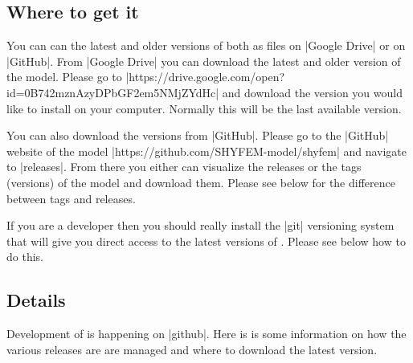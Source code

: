 
%
%
%
%
%
%
%

\subsection{Where to get it}

You can can the latest and older versions of \shyfem{} both as
files on |Google Drive| or on |GitHub|. From |Google Drive| you can
download the latest and older version of the model. Please go to
|https://drive.google.com/open?id=0B742mznAzyDPbGF2em5NMjZYdHc| and
download the version you would like to install on your computer. Normally
this will be the last available version.

You can also download the versions from |GitHub|. Please
go to the |GitHub| website of the \shyfem{} model
|https://github.com/SHYFEM-model/shyfem| and navigate to |releases|. From
there you either can visualize the releases or the tags (versions)
of the model and download them. Please see below for the difference
between tags and releases.

If you are a developer then you should really install the |git|
versioning system that will give you direct access to the latest versions
of \shyfem{}.  Please see below how to do this.

\subsection{Details}

Development of \shyfem{} is happening on |github|. Here is is some
information on how the various releases are are managed and where to
download the latest version.

